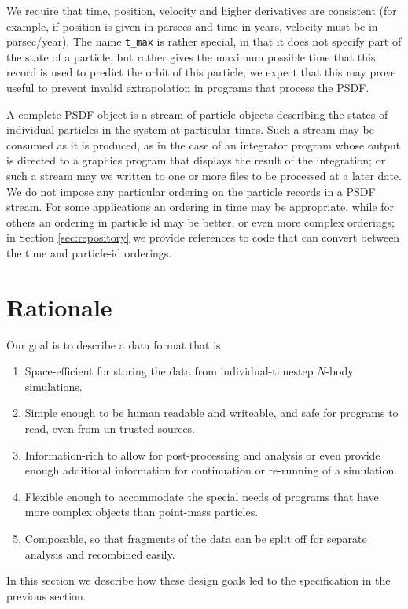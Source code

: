 \documentclass[5p,authoryear]{elsarticle}
\begin{document}
We require that time, position, velocity and higher derivatives are
consistent (for example, if position is given in parsecs and time in
years, velocity must be in parsec/year).  The name {\tt t\_max} is
rather special, in that it does not specify part of the state of a
particle, but rather gives the maximum possible time that this record
is used to predict the orbit of this particle; we expect that this may
prove useful to prevent invalid extrapolation in programs that process
the PSDF.



A complete PSDF object is a stream of particle objects describing the
states of individual particles in the system at particular times.
Such a stream may be consumed as it is produced, as in the case of an
integrator program whose output is directed to a graphics program that
displays the result of the integration; or such a stream may we
written to one or more files to be processed at a later date.  We do
not impose any particular ordering on the particle records in a PSDF
stream.  For some applications an ordering in time may be appropriate,
while for others an ordering in particle id may be better, or even
more complex orderings; in Section \ref{sec:repository} we provide
references to code that can convert between the time and particle-id
orderings.

\section{Rationale}

Our goal is to describe a data format that is 
\begin{enumerate}
\item Space-efficient for storing the data from individual-timestep
  $N$-body simulations.
\item Simple enough to be human readable and writeable, and safe for
  programs to read, even from un-trusted sources.
\item Information-rich to allow for post-processing and analysis or
  even provide enough additional information for continuation or
  re-running of a simulation.
\item Flexible enough to accommodate the special needs of programs
  that have more complex objects than point-mass particles.
\item Composable, so that fragments of the data can be split off for
  separate analysis and recombined easily.
\end{enumerate}
In this section we describe how these design goals led to the
specification in the previous section.
\end{document}
